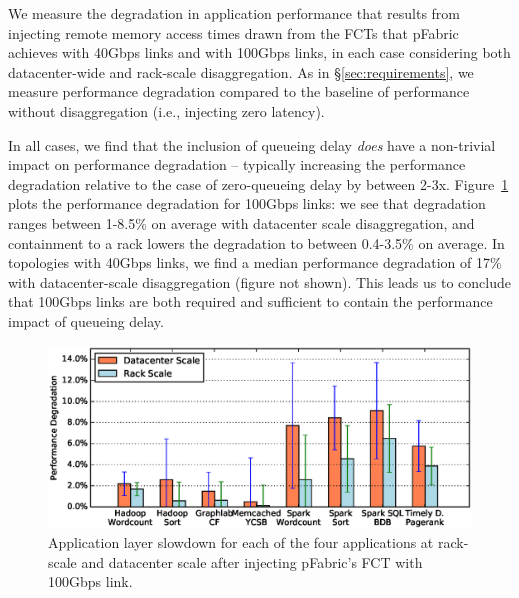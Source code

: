 We measure the degradation in application performance that results from injecting remote memory access times drawn from the FCTs that pFabric achieves with 40Gbps links and with 100Gbps links, in each case considering both datacenter-wide and rack-scale disaggregation. As in \S\ref{sec:requirements}, we measure performance degradation compared to the baseline of performance without disaggregation (i.e., injecting zero latency). 

In all cases, we find that the inclusion of queueing delay \emph{does} have a non-trivial impact on performance degradation -- typically increasing the performance degradation relative to the case of zero-queueing delay by between 2-3x. 
Figure~\ref{fig:appfabric100} plots the performance degradation for 100Gbps links: we see that degradation ranges between 1-8.5\% on average with datacenter scale disaggregation, and containment to a rack lowers the degradation to between 0.4-3.5\% on average. In topologies with 40Gbps links, we find a median performance degradation of 17\% with datacenter-scale disaggregation (figure not shown). 
This leads us to conclude that 100Gbps links are both required and sufficient to contain the performance impact of queueing delay.




%
\begin{figure}
  \centering
    \includegraphics[width = \columnwidth]{img/slowdown.eps} 
  \caption{\small{Application layer slowdown for each of the four applications at rack-scale and datacenter scale after injecting pFabric's FCT with 100Gbps link. }}
  \label{fig:appfabric100}
\end{figure}
%

\vspace{-0.1in}
